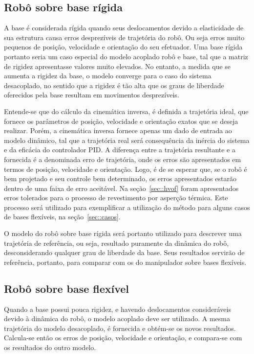 \subsection{Robô sobre base rígida}

A base é considerada rígida quando seus deslocamentos devido a elasticidade de
sua estrutura causa erros desprezíveis de trajetória do robô. Ou seja erros
muito pequenos de posição, velocidade e orientação do seu efetuador. Uma base
rígida portanto seria um caso especial do modelo acoplado robô e base, tal que a
matriz de rigidez apresentasse valores muito elevados. No entanto, a medida que
se aumenta a rigidez da base, o modelo converge para o caso do sistema
desacoplado, no sentido que a rigidez é tão alta que os graus de liberdade
oferecidos pela base resultam em movimentos desprezíveis.

Entende-se que do cálculo da cinemática inversa, é definida a trajetória ideal,
que fornece os parâmetros de posição, velocidade e orientação exatos que se
deseja realizar.
Porém, a cinemática inversa fornece apenas um dado de entrada ao modelo
dinâmico, tal que a trajetória real será consequência da inércia do sistema e da
eficácia do controlador PID. A diferença entre a trajetória resultante e a
fornecida é a denominada erro de trajetória, onde os erros são apresentados em
termos de posição, velocidade e orientação. Logo, é de se esperar que, se o robô
é bem projetado e seu controle bem determinado, os erros apresentados estarão
dentro de uma faixa de erro aceitável. Na seção~\ref{sec::hvof} foram
apresentados erros tolerados para o processo de revestimento por asperção
térmica. Este processo será utilizado para exemplificar a utilização do método
para alguns casos de bases flexíveis, na seção~\ref{sec::casos}.

O modelo do robô sobre base rígida será portanto utilizado para descrever uma
trajetória de referência, ou seja, resultado puramente da dinâmica do robô,
desconsiderando qualquer grau de liberdade da base. Seus resultados servirão de
referência, portanto, para comparar com os do manipulador sobre bases flexíveis.

\subsection{Robô sobre base flexível}

Quando a base possui pouca rigidez, e havendo deslocamentos consideráveis devido
à dinâmica do robô, o modelo acoplado deve ser utilizado. A mesma trajetória do
modelo desacoplado, é fornecida e obtém-se os novos resultados. Calcula-se então
os erros de posição, velocidade e orientação, e compara-se com os resultados do
outro modelo.




